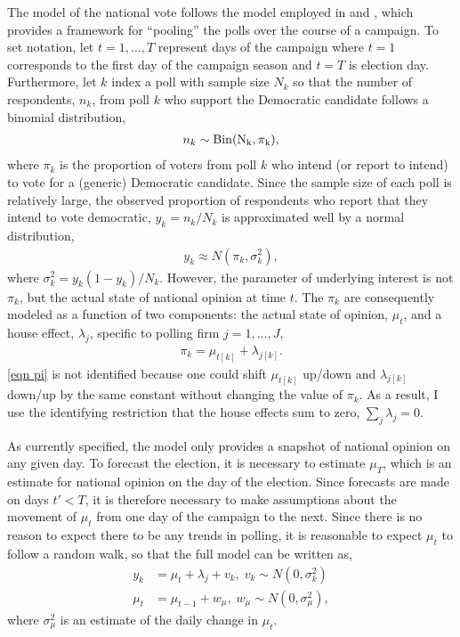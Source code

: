 \documentclass[12pt,final,fleqn]{article}
\theoremstyle{plain}
\begin{document}
The model of the national vote follows the model employed in \citet{jackman2005pooling} and \citet{jackman2009bayesian}, which provides a framework for ``pooling'' the polls over the course of a campaign. To set notation, let $t=1,\ldots,T$ represent days of the campaign where $t=1$ corresponds to the first day of the campaign season and $t=T$ is election day. Furthermore, let $k$ index a poll with sample size $N_k$ so that the number of respondents, $n_k$, from poll $k$ who support the Democratic candidate follows a binomial distribution,
\begin{align}
n_k \sim \rm{Bin}(N_k, \pi_k),
\end{align}
where $\pi_k$ is the proportion of voters from poll $k$ who intend (or report to intend) to vote for a (generic) Democratic candidate. Since the sample size of each poll is relatively large, the observed proportion of respondents who report that they intend to vote democratic, $y_k = n_k/N_k$ is approximated well by a normal distribution,
\begin{align}
y_k \approx N(\pi_k, \sigma^2_k),
\end{align}
where $\sigma^2_k= y_k(1-y_k)/N_k$. However, the parameter of underlying interest is not $\pi_k$, but the actual state of national opinion at time $t$. The $\pi_k$ are consequently modeled as a function of two components: the actual state of opinion, $\mu_t$, and a house effect, $\lambda_j$, specific to polling firm $j = 1,\ldots, J$,
\begin{align} \label{eqn pi}
\pi_k = \mu_{t[k]} + \lambda_{j[k]}.
\end{align}
\autoref{eqn pi} is not identified because one could shift $\mu_{t[k]}$ up/down and $\lambda_{j[k]}$ down/up by the same constant without changing the value of $\pi_k$. As a result, I use the identifying restriction that the house effects sum to zero, $\sum_j \lambda_j = 0$.

As currently specified, the model only provides a snapshot of national opinion on any given day. To forecast the election, it is necessary to estimate $\mu_T$, which is an estimate for national opinion on the day of the election. Since forecasts are made on days $t' <T$, it is therefore necessary to make assumptions about the movement of $\mu_t$ from one day of the campaign to the next. Since there is no reason to expect there to be any trends in polling, it is reasonable to expect $\mu_t$ to follow a random walk, so that the full model can be written as,
\begin{align}
\label{observation eqn national}
y_k &= \mu_{t} + \lambda_{j} + v_k, \; v_k\sim N(0, \sigma^2_k)\\ 
\label{system eqn national}
\mu_{t} &= \mu_{t-1} + w_\mu, \; w_\mu \sim N(0, \sigma^2_{\mu}),
\end{align}
where $\sigma^2_\mu$ is an estimate of the daily change in $\mu_t$.
\end{document}
